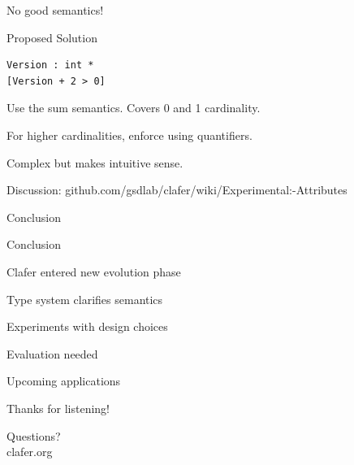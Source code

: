 \documentclass[table,15pt,t]{beamer}
\newcommand{\vmiddle}[1]{
  \vspace{\stretch{1}}
  #1
  \vspace{\stretch{1}}
}
\newcommand{\interframe}[1]{
\begin{frame}{}
\vmiddle{\hmiddle{\Huge #1}}
\end{frame}
}
\newcommand{\mlist}[1]{
\vmiddle{
  \begin{list}{}{}
    #1
  \end{list}
  }
}
\newcommand{\hmiddle}[1]{
  \begin{center}#1\end{center}
}
\begin{document}
\interframe{No good semantics!}

\begin{frame}[fragile,c]{Proposed Solution}
\begin{lstlisting}
Version : int *
[Version + 2 > 0]
\end{lstlisting}
\begin{list}{}{}
    \item Use the sum semantics. Covers 0 and 1 cardinality.
    \item For higher cardinalities, enforce using quantifiers.
    \item Complex but makes intuitive sense.
    \item Discussion: github.com/gsdlab/clafer/wiki/Experimental:-Attributes
\end{list}
\end{frame}

\interframe{Conclusion}

\begin{frame}{Conclusion}
 \mlist{
    \item Clafer entered new evolution phase
    \item Type system clarifies semantics
    \item Experiments with design choices
    \item Evaluation needed
    \item Upcoming applications
 }
\end{frame}

\interframe{Thanks for listening!}

\interframe{Questions?\\[1cm]\normalsize{\textsf{clafer.org}}}
\end{document}
